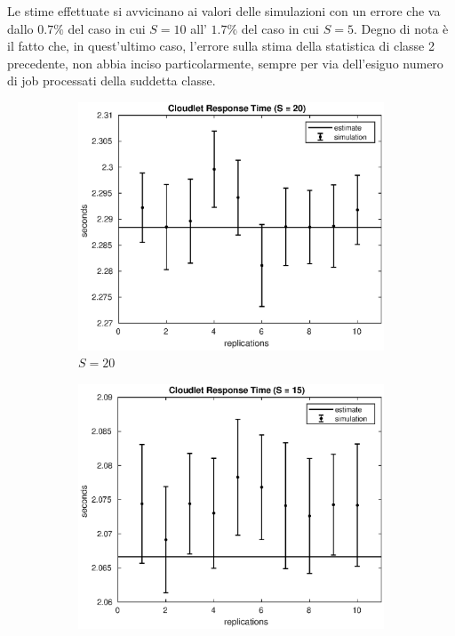 Le stime effettuate si avvicinano ai valori delle simulazioni con un errore che
va dallo $0.7\%$ del caso in cui $S=10$ all' $1.7\%$ del caso in cui $S=5$.
Degno di nota è il fatto che, in quest'ultimo caso, l'errore sulla stima della
statistica di classe 2 precedente, non abbia inciso particolarmente, sempre
per via dell'esiguo numero di job processati della suddetta classe.
\begin{figure}[!h]
\centering
%
\begin{subfigure}[t]{0.49\textwidth}
\includegraphics[width=\textwidth]{figures/simul/20_500K_sclet}
\caption{$S = 20$}
\label{20_sclet}
\end{subfigure}
%
\begin{subfigure}[t]{0.49\textwidth}
\includegraphics[width=\textwidth]{figures/simul/15_500K_sclet}

\end{subfigure}
\end{figure}
